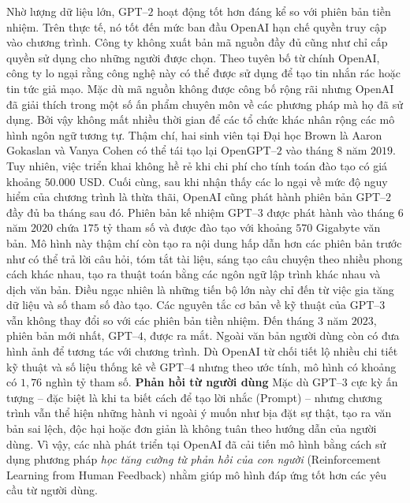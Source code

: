 \begin{multicols}{2}
	\vskip 0.1cm
	Nhờ lượng dữ liệu lớn, GPT--$2$ hoạt động tốt hơn đáng kể so với phiên bản tiền nhiệm. Trên thực tế, nó tốt đến mức ban đầu OpenAI hạn chế quyền truy cập vào chương trình. Công ty không xuất bản mã nguồn đầy đủ cũng như chỉ cấp quyền sử dụng cho những người được chọn. Theo tuyên bố từ chính OpenAI, công ty lo ngại rằng công nghệ này có thể được sử dụng để tạo tin nhắn rác hoặc tin tức giả mạo. 
	\vskip 0.1cm
	Mặc dù mã nguồn không được công bố rộng rãi nhưng OpenAI đã giải thích trong một số ấn phẩm chuyên môn về các phương pháp mà họ đã sử dụng. Bởi vậy không mất nhiều thời gian để các tổ chức khác nhân rộng các mô hình ngôn ngữ tương tự. Thậm chí, hai sinh viên tại Đại học Brown là Aaron Gokaslan và Vanya Cohen có thể tái tạo lại OpenGPT--$2$ vào tháng $8$ năm $2019$. Tuy nhiên, việc triển khai không hề rẻ khi chi phí cho tính toán đào tạo có giá khoảng $50.000$ USD. Cuối cùng, sau khi nhận thấy các lo ngại về mức độ nguy hiểm của chương trình là thừa thãi, OpenAI cũng phát hành phiên bản GPT--$2$ đầy đủ ba tháng sau đó.
	\vskip 0.1cm
	Phiên bản kế nhiệm GPT--$3$ được phát hành vào tháng $6$ năm $2020$ chứa $175$ tỷ tham số và được đào tạo với khoảng $570$ Gigabyte văn bản. Mô hình này thậm chí còn tạo ra nội dung hấp dẫn hơn các phiên bản trước như có thể trả lời câu hỏi, tóm tắt tài liệu, sáng tạo câu chuyện theo nhiều phong cách khác nhau, tạo ra thuật toán bằng các ngôn ngữ lập trình khác nhau và dịch văn bản. Điều ngạc nhiên là những tiến bộ lớn này chỉ đến từ việc gia tăng dữ liệu và số tham số đào tạo. Các nguyên tắc cơ bản về kỹ thuật của GPT--$3$ vẫn không thay đổi so với các phiên bản tiền nhiệm.
	\vskip 0.1cm
	Đến tháng $3$ năm $2023$, phiên bản mới nhất, GPT--$4$, được ra mắt. Ngoài văn bản người dùng còn có đưa hình ảnh để tương tác với chương trình. Dù OpenAI từ chối tiết lộ nhiều chi tiết kỹ thuật và số liệu thống kê về GPT--$4$ nhưng theo ước tính, mô hình có khoảng có $1,76$ nghìn tỷ tham số.
	\vskip 0.1cm
	\textbf{\color{timhieukhoahoc}Phản hồi từ người dùng}
	\vskip 0.1cm
	Mặc dù GPT--$3$ cực kỳ ấn tượng -- đặc biệt là khi ta biết cách để tạo lời nhắc (Prompt) -- nhưng chương trình vẫn thể hiện những hành vi ngoài ý muốn như bịa đặt sự thật, tạo ra văn bản sai lệch, độc hại hoặc đơn giản là không tuân theo hướng dẫn của người dùng. Vì vậy, các nhà phát triển tại OpenAI đã cải tiến mô hình bằng cách sử dụng phương pháp \textit{học tăng cường từ phản hồi của con người} (Reinforcement Learning from Human Feedback) nhằm giúp mô hình đáp ứng tốt hơn các yêu cầu từ người dùng.
	\vskip 0.1cm

\end{multicols}
